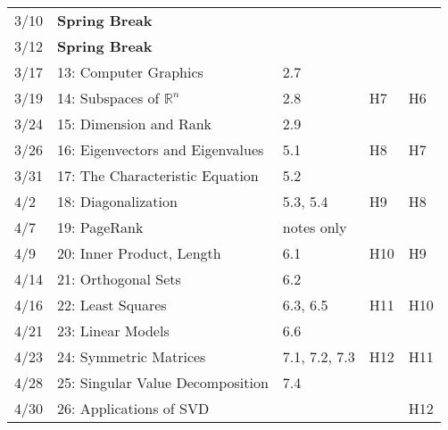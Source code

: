 \documentclass[11pt]{article}
\begin{document}
\begin{centering}
\begin{tabular}{||l|p{3in}|l|l|l||}
  3/10 & \textbf{Spring Break} &&& \\
  3/12 & \textbf{Spring Break} &&& \\
  \hline

3/17 & 13: Computer Graphics  & 2.7 & & \\ 
3/19 & 14: Subspaces of $\mathbb{R}^n$  & 2.8 & H7 & H6\\ 
\hline

3/24 & 15: Dimension and Rank  & 2.9 &  & \\ 
3/26 & 16: Eigenvectors and Eigenvalues  &  5.1 & H8 & H7\\ 
\hline

3/31 & 17: The Characteristic Equation  & 5.2 & & \\ 
4/2 & 18: Diagonalization  & 5.3, 5.4 & H9 & H8\\  %
\hline

4/7 & 19: PageRank  & notes only &  & \\
4/9 & 20: Inner Product, Length   & 6.1 & H10 & H9\\ 
\hline

4/14 &21: Orthogonal Sets & 6.2 &  & \\ 
  4/16 & 22: Least Squares   & 6.3, 6.5 & H11 & H10 \\
  \hline 


4/21 & 23: Linear Models  & 6.6 &  &\\ 
4/23 & 24: Symmetric Matrices  &7.1, 7.2, 7.3 & H12 & H11\\
\hline  
4/28 & 25: Singular Value Decomposition  & 7.4 &  &\\ 
4/30 & 26: Applications of SVD  && & H12 \\

\hline\hline


\end{tabular}\\
\end{centering}
\end{document}
